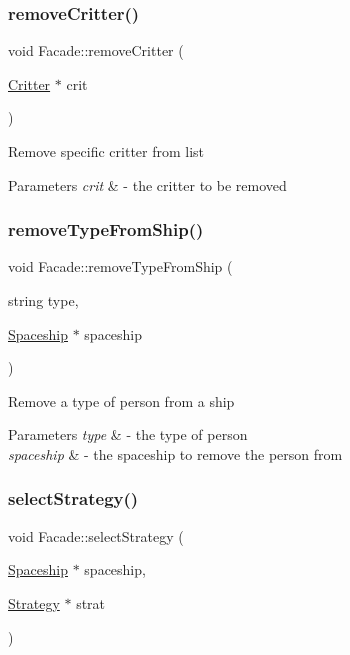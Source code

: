 \subsubsection{\texorpdfstring{remove\+Critter()}{removeCritter()}}
{\footnotesize\ttfamily void Facade\+::remove\+Critter (\begin{DoxyParamCaption}\item[{\hyperlink{classCritter}{Critter} $\ast$}]{crit }\end{DoxyParamCaption})}

Remove specific critter from list 
\begin{DoxyParams}{Parameters}
{\em crit} & -\/ the critter to be removed \\
\hline
\end{DoxyParams}
\mbox{\label{classFacade_ad0bc0c8387b51b0ead3499747ba846cd}} 
\subsubsection{\texorpdfstring{remove\+Type\+From\+Ship()}{removeTypeFromShip()}}
{\footnotesize\ttfamily void Facade\+::remove\+Type\+From\+Ship (\begin{DoxyParamCaption}\item[{string}]{type,  }\item[{\hyperlink{classSpaceship}{Spaceship} $\ast$}]{spaceship }\end{DoxyParamCaption})}

Remove a type of person from a ship 
\begin{DoxyParams}{Parameters}
{\em type} & -\/ the type of person \\
\hline
{\em spaceship} & -\/ the spaceship to remove the person from \\
\hline
\end{DoxyParams}
\mbox{\label{classFacade_a284506af0f160efbe15bb93dfccb792e}} 
\subsubsection{\texorpdfstring{select\+Strategy()}{selectStrategy()}}
{\footnotesize\ttfamily void Facade\+::select\+Strategy (\begin{DoxyParamCaption}\item[{\hyperlink{classSpaceship}{Spaceship} $\ast$}]{spaceship,  }\item[{\hyperlink{classStrategy}{Strategy} $\ast$}]{strat }\end{DoxyParamCaption})}

